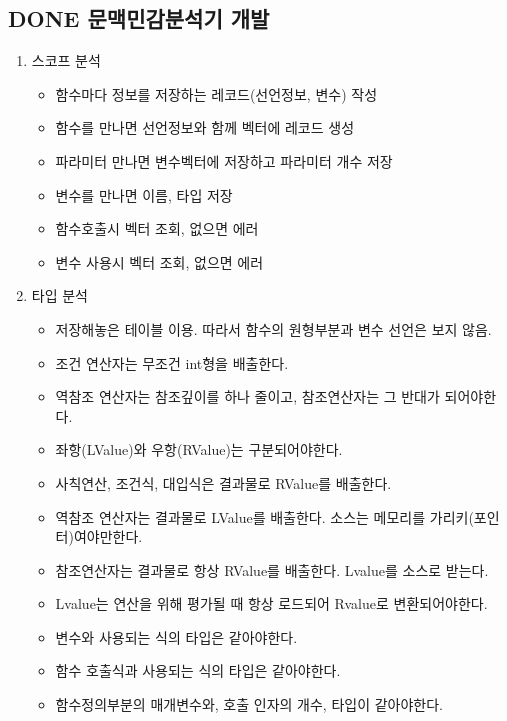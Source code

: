 \documentclass[11pt]{article}
\begin{document}
\subsection{{\bfseries\sffamily DONE} 문맥민감분석기 개발}
\label{sec:org70b025c}
\begin{enumerate}
\item 스코프 분석
\begin{itemize}
\item[{$\boxtimes$}] 함수마다 정보를 저장하는 레코드(선언정보, 변수) 작성
\item[{$\boxtimes$}] 함수를 만나면 선언정보와 함께 벡터에 레코드 생성
\item[{$\boxtimes$}] 파라미터 만나면 변수벡터에 저장하고 파라미터 개수 저장
\item[{$\boxtimes$}] 변수를 만나면 이름, 타입 저장
\item[{$\boxtimes$}] 함수호출시 벡터 조회, 없으면 에러
\item[{$\boxtimes$}] 변수 사용시 벡터 조회, 없으면 에러
\end{itemize}
\item 타입 분석
\begin{itemize}
\item[{$\boxtimes$}] 저장해놓은 테이블 이용. 따라서 함수의 원형부분과 변수 선언은 보지 않음.
\item[{$\boxtimes$}] 조건 연산자는 무조건 int형을 배출한다.
\item[{$\boxtimes$}] 역참조 연산자는 참조깊이를 하나 줄이고, 참조연산자는 그 반대가 되어야한다.
\item[{$\boxtimes$}] 좌항(LValue)와 우항(RValue)는 구분되어야한다.
\item[{$\boxtimes$}] 사칙연산, 조건식, 대입식은 결과물로 RValue를 배출한다.
\item[{$\boxtimes$}] 역참조 연산자는 결과물로 LValue를 배출한다. 소스는 메모리를 가리키(포인터)여야만한다.
\item[{$\boxtimes$}] 참조연산자는 결과물로 항상 RValue를 배출한다. Lvalue를 소스로 받는다.
\item[{$\boxtimes$}] Lvalue는 연산을 위해 평가될 때 항상 로드되어 Rvalue로 변환되어야한다.
\item[{$\boxtimes$}] 변수와 사용되는 식의 타입은 같아야한다.
\item[{$\boxtimes$}] 함수 호출식과 사용되는 식의 타입은 같아야한다.
\item[{$\boxtimes$}] 함수정의부분의 매개변수와, 호출 인자의 개수, 타입이 같아야한다.
\end{itemize}


\end{enumerate}
\end{document}
